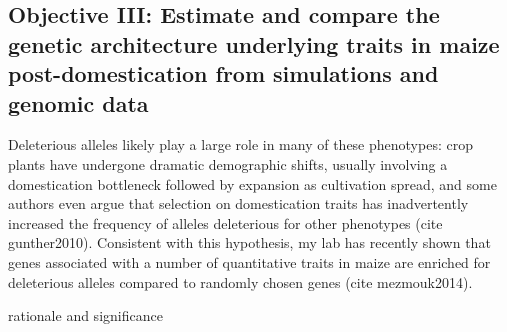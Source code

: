 \subsection*{Objective III: Estimate and compare the genetic architecture underlying traits in maize post-domestication from simulations and genomic data} 

Deleterious alleles likely play a large role in many of these phenotypes: crop plants have undergone dramatic demographic shifts, usually involving a domestication bottleneck followed by expansion as cultivation spread, and some authors even argue that selection on domestication traits has inadvertently increased the frequency of alleles deleterious for other phenotypes (cite gunther2010). 
Consistent with this hypothesis, my lab has recently shown that genes associated with a number of quantitative traits in maize are enriched for deleterious alleles  compared to randomly chosen genes (cite mezmouk2014).



 rationale and significance










